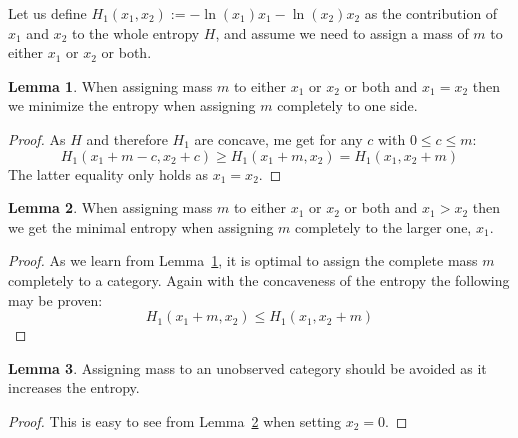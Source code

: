 \documentclass[a4paper]{article}
\theoremstyle{definition} \newtheorem{lemma}{Lemma}
\theoremstyle{remark} \newtheorem{remark}{Remark}
\begin{document}
Let us define $H_1(x_1,x_2) := -\ln(x_1)x_1 - \ln(x_2)x_2$ as the contribution of $x_1$ and $x_2$ to the whole entropy $H$, and assume we need to assign a mass of $m$ to either $x_1$ or $x_2$ or both.

\begin{lemma}
\label{lemma1}
When assigning mass $m$ to either $x_1$ or $x_2$ or both and $x_1 = x_2$ then we minimize the entropy when assigning $m$ completely to one side. 
\end{lemma}
\begin{proof}
As $H$ and therefore $H_1$ are concave, me get for any $c$ with $0 \leq c \leq m$:
\begin{displaymath}
H_1(x_1 + m-c, x_2+c) \geq H_1(x_1+m, x_2) = H_1(x_1,x_2+m)
\end{displaymath}
The latter equality only holds as $x_1 = x_2$. 
\end{proof}

\begin{lemma}
\label{lemma2}
When assigning mass $m$ to either $x_1$ or $x_2$ or both and $x_1 > x_2$ then we get the minimal entropy when assigning $m$ completely to the larger one, $x_1$.
\end{lemma}
\begin{proof}
As we learn from Lemma~\ref{lemma1}, it is optimal to assign the complete mass $m$ completely to a category. Again with the concaveness of the entropy the following may be proven:
\begin{displaymath}
H_1(x_1 + m, x_2) \leq H_1(x_1,x_2 + m)
\end{displaymath}
\end{proof}

\begin{lemma}
\label{lemma3}
Assigning mass to an unobserved category should be avoided as it increases the entropy.
\end{lemma}
\begin{proof}
This is easy to see from Lemma~\ref{lemma2} when setting $x_2 = 0$.
\end{proof}
\end{document}
